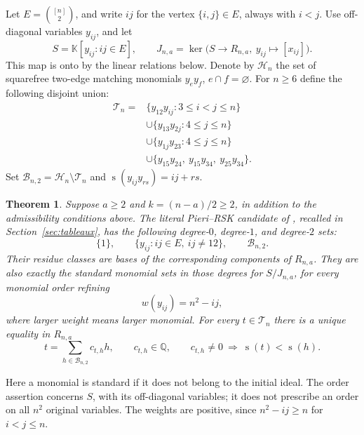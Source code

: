 \documentclass[11pt,a4paper]{article}
\newtheorem{theorem}{Theorem}
\newcommand{\kk}{\mathbb{K}}
\newcommand{\QQ}{\mathbb{Q}}
\newcommand{\HH}{\mathcal{H}_n}
\newcommand{\TT}{\mathcal{T}_n}
\newcommand{\BB}{\mathcal{B}_{n,2}}
\DeclareMathOperator{\score}{s}
\begin{document}
Let $E=\binom{[n]}2$, and write $ij$ for the vertex $\{i,j\}\in E$,
always with $i<j$. Use off-diagonal variables $y_{ij}$, and let
\[
 S=\kk[y_{ij}:ij\in E],\qquad
 J_{n,a}=\ker\bigl(S\longrightarrow R_{n,a},\ y_{ij}\longmapsto[x_{ij}]\bigr).
\]
This map is onto by the linear relations below. Denote by $\HH$ the
set of squarefree two-edge matching monomials $y_e y_f$, $e\cap f=\varnothing$.
For $n\geq6$ define the following disjoint union:
\begin{equation}\label{eq:T}
\begin{aligned}
 \TT={}&\{y_{12}y_{ij}:3\leq i<j\leq n\}\\
 &\mathbin{\cup}\{y_{13}y_{2j}:4\leq j\leq n\}\\
 &\mathbin{\cup}\{y_{1j}y_{23}:4\leq j\leq n\}\\
 &\mathbin{\cup}\{y_{15}y_{24},\ y_{15}y_{34},\ y_{25}y_{34}\}.
\end{aligned}
\end{equation}
Set $\BB=\HH\setminus\TT$ and
$\score(y_{ij}y_{rs})=ij+rs$.

\begin{theorem}\label{thm:main}
Suppose $a\geq2$ and $k=(n-a)/2\geq2$, in addition to the admissibility
conditions above. The literal Pieri--RSK candidate of
\cite[Problem 29]{ZhuPositive}, recalled in Section~\ref{sec:tableaux},
has the following degree-$0$, degree-$1$, and degree-$2$ sets:
\begin{equation}\label{eq:bases}
 \{1\},\qquad \{y_{ij}:ij\in E,\ ij\ne12\},\qquad \BB.
\end{equation}
Their residue classes are bases of the corresponding components of
$R_{n,a}$. They are also exactly the standard monomial sets in those
degrees for $S/J_{n,a}$, for every monomial order refining
\begin{equation}\label{eq:weight}
 w(y_{ij})=n^2-ij,
\end{equation}
where larger weight means larger monomial.
For every $t\in\TT$ there is a unique equality in $R_{n,a}$
\begin{equation}\label{eq:straighten}
 t=\sum_{h\in\BB}c_{t,h}h,
 \qquad c_{t,h}\in\QQ,
 \qquad c_{t,h}\ne0\ \Longrightarrow\ \score(t)<\score(h).
\end{equation}
\end{theorem}

Here a monomial is standard if it does not belong to the initial ideal.
The order assertion concerns $S$, with its off-diagonal variables; it
does not prescribe an order on all $n^2$ original variables. The weights
are positive, since $n^2-ij\geq n$ for $i<j\leq n$.
\end{document}
